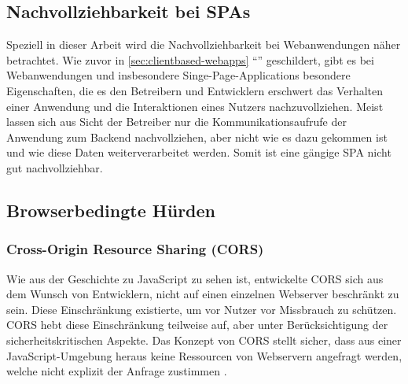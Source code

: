 \subsection{Nachvollziehbarkeit bei SPAs}
\label{sec:nachvollziehbarkeit-bei-spas}

Speziell in dieser Arbeit wird die Nachvollziehbarkeit bei Webanwendungen näher betrachtet. Wie zuvor in \autoref{sec:clientbased-webapps} \enquote{} geschildert, gibt es bei Webanwendungen und insbesondere Singe-Page-Applications besondere Eigenschaften, die es den Betreibern und Entwicklern erschwert das Verhalten einer Anwendung und die Interaktionen eines Nutzers nachzuvollziehen. Meist lassen sich aus Sicht der Betreiber nur die Kommunikationsaufrufe der Anwendung zum Backend nachvollziehen, aber nicht wie es dazu gekommen ist und wie diese Daten weiterverarbeitet werden. Somit ist eine gängige SPA nicht gut nachvollziehbar.
	


\subsection{Browserbedingte Hürden}


\subsubsection{Cross-Origin Resource Sharing (CORS)}

Wie aus der Geschichte zu JavaScript zu sehen ist, entwickelte CORS sich aus dem Wunsch von Entwicklern, nicht auf einen einzelnen Webserver beschränkt zu sein. Diese Einschränkung existierte, um vor Nutzer vor Missbrauch zu schützen. CORS hebt diese Einschränkung teilweise auf, aber unter Berücksichtigung der sicherheitskritischen Aspekte. Das Konzept von CORS stellt sicher, dass aus einer JavaScript-Umgebung heraus keine Ressourcen von Webservern angefragt werden, welche nicht explizit der Anfrage zustimmen \cite{MDNCORS}.


